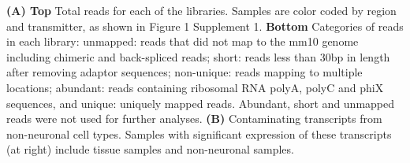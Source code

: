 \textbf{(A) Top} Total reads for each of the libraries. Samples are color coded by region and transmitter, as shown in Figure 1 Supplement 1.
\textbf{Bottom} Categories of reads in each library: unmapped: reads that did not map to the mm10 genome including chimeric and back-spliced reads; short: reads less than 30bp in length after removing adaptor sequences; non-unique: reads mapping to multiple locations; abundant: reads containing ribosomal RNA polyA, polyC and phiX sequences, and unique: uniquely mapped reads. Abundant, short and unmapped reads were not used for further analyses.
\textbf{(B)} Contaminating transcripts from non-neuronal cell types. Samples with significant expression of these transcripts (at right) include tissue samples and non-neuronal samples. 
